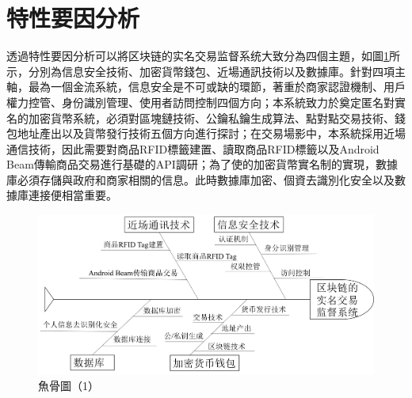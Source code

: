 	\section{特性要因分析}
	透過特性要因分析可以將区块链的实名交易监督系统大致分為四個主題，如圖\ref{fish1}所示，分別為信息安全技術、加密貨幣錢包、近場通訊技術以及數據庫。針對四項主軸，最為一個金流系統，信息安全是不可或缺的環節，著重於商家認證機制、用戶權力控管、身份識別管理、使用者訪問控制四個方向；本系統致力於奠定匿名對實名的加密貨幣系統，必須對區塊鏈技術、公鑰私鑰生成算法、點對點交易技術、錢包地址產出以及貨幣發行技術五個方向進行探討；在交易場影中，本系統採用近場通信技術，因此需要對商品RFID標籤建置、讀取商品RFID標籤以及Android Beam傳輸商品交易進行基礎的API調研；為了使的加密貨幣實名制的實現，數據庫必須存儲與政府和商家相關的信息。此時數據庫加密、個資去識別化安全以及數據庫連接便相當重要。
		\begin{figure}[htbp]
			\centering
			\includegraphics[width = 1\textwidth]{fish1.png}
			\caption{魚骨圖（1）}\label{fish1}
		\end{figure}


